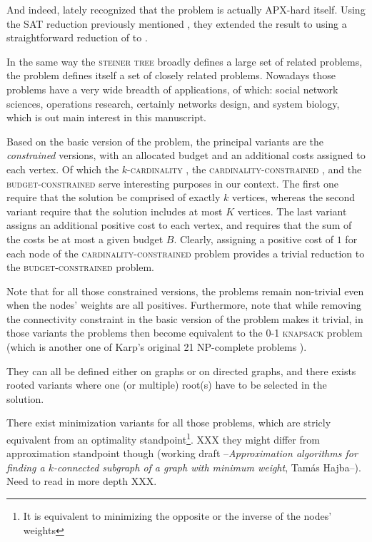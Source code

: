 	And indeed, lately \textcite{alvarez2013maximum} recognized that the \mwcs{} problem is actually APX-hard itself.
	Using the SAT reduction previously mentioned \parencite{feigenbaum2000sharing}, they extended the result to \mwcs{} using a straightforward reduction of \pcst{} to \mwcs{}.

	In the same way the \textsc{steiner tree} broadly defines a large set of related problems, the \mwcs{} problem defines itself a set of closely related problems.
	Nowadays those problems have a very wide breadth of applications, of which: social network sciences, operations research, certainly networks design, and system biology, which is out main interest in this manuscript.

	Based on the basic version of the \mwcs{} problem, the principal variants are the \emph{constrained} versions, with an allocated budget and an additional costs assigned to each vertex.
	Of which the \textsc{$k$-cardinality \mwcs{}}, the \textsc{cardinality-constrained \mwcs{}}, and the \textsc{budget-constrained \mwcs{}} serve interesting purposes in our context.
	The first one require that the solution be comprised of exactly $k$ vertices, whereas the second variant require that the solution includes at most $K$ vertices.
	The last variant assigns an additional positive cost to each vertex, and requires that the sum of the costs be at most a given budget $B$.
	Clearly, assigning a positive cost of $1$ for each node of the \textsc{cardinality-constrained \mwcs{}} problem provides a trivial reduction to the \textsc{budget-constrained \mwcs{}} problem.

	Note that for all those constrained versions, the problems remain non-trivial even when the nodes' weights are all positives.
	Furthermore, note that while removing the connectivity constraint in the basic version of the problem makes it trivial, in those variants the problems then become equivalent to the \textsc{0-1 knapsack} problem (which is another one of Karp's original 21 NP-complete problems \parencite{karp1972reducibility}).

	They can all be defined either on graphs or on directed graphs, and there exists rooted variants where one (or multiple) root(s) have to be selected in the solution.

	There exist minimization variants for all those problems, which are stricly equivalent from an optimality standpoint\footnote{It is equivalent to minimizing the opposite or the inverse of the nodes' weights}.
	XXX they might differ from approximation standpoint though (working draft --\emph{Approximation algorithms for finding a $k$-connected subgraph of a graph with minimum weight}, Tam\'{a}s Hajba--). Need to read in more depth XXX.

